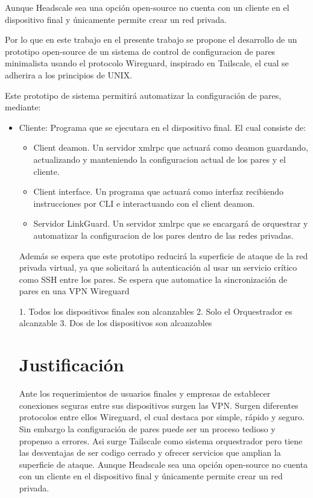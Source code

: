 \documentclass[letterpaper,12pt,oneside]{book}
\begin{document}
Aunque Headscale sea una opción open-source no cuenta con un cliente en el dispositivo final y únicamente permite crear un red privada.

Por lo que en este trabajo en el presente trabajo se propone el desarrollo de un prototipo open-source de un sistema de control de configuracion de pares minimalista usando el protocolo Wireguard, inspirado en Tailscale, el cual se adherira a los principios de UNIX.

Este prototipo de sistema permitirá automatizar la configuración de pares, mediante:
\begin{itemize}
    \item Cliente: Programa que se ejecutara en el dispositivo final. El cual consiste de:
    \begin{itemize}
        \item Client deamon. Un servidor xmlrpc que actuará como deamon guardando, actualizando y manteniendo la configuracion actual de los pares y el cliente.
        \item Client interface. Un programa que actuará como interfaz recibiendo instrucciones por CLI e interactuando con el client deamon.

    \item Servidor LinkGuard. Un servidor xmlrpc que se encargará de orquestrar y automatizar la configuracion de los pares dentro de las redes privadas.
\end{itemize}

Además se espera que este prototipo reducirá la superficie de ataque de la red privada virtual, ya que solicitará la autenticación al usar un servicio crítico como SSH entre los pares.
Se espera que automatice la sincronización de pares en una VPN Wireguard

1. Todos los dispositivos finales son alcanzables
2. Solo el Orquestrador es alcanzable
3. Dos de los dispositivos son alcanzables

\section{Justificación}
    
Ante los requerimientos de usuarios finales y empresas de establecer conexiones seguras entre sus dispositivos surgen las VPN. Surgen diferentes protocolos entre ellos Wireguard, el cual destaca por simple, rápido y seguro. Sin embargo la configuración de pares puede ser un proceso tedioso y propenso a errores. Asi surge Tailscale como sistema orquestrador pero tiene las desventajas de ser codigo cerrado y ofrecer servicios que amplian la superficie de ataque. Aunque Headscale sea una opción open-source no cuenta con un cliente en el dispositivo final y únicamente permite crear un red privada.


\end{itemize}
\end{document}
